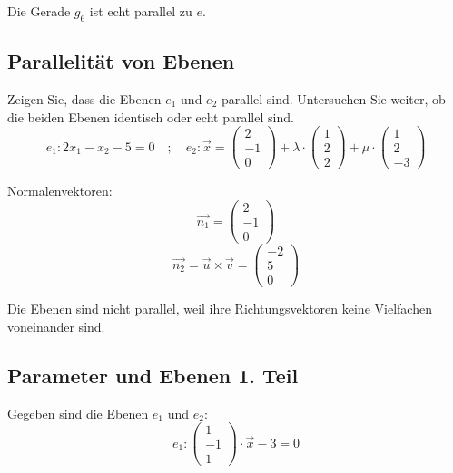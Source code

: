\documentclass{ajc}
\numberwithin{equation}{subsection}
\begin{document}
	Die Gerade $g_6$ ist echt parallel zu $e$.
	
	\subsection{Parallelität von Ebenen}
	Zeigen Sie, dass die Ebenen $e_1$ und $e_2$ parallel sind. Untersuchen Sie weiter, ob die beiden Ebenen identisch oder echt parallel sind.
	\begin{equation}
		e_1: 2x_1 - x_2 - 5 = 0 \quad ; \quad e_2: \vec{x} = \left(\begin{array}{r} 2 \\ -1 \\ 0\end{array}\right) + \lambda \cdot \left(\begin{array}{r} 1 \\ 2 \\ 2\end{array}\right) + \mu \cdot \left(\begin{array}{r} 1 \\ 2 \\ -3\end{array}\right)
	\end{equation}
	
	Normalenvektoren:
	\begin{equation}
		\vec{n_1} = \left(\begin{array}{r} 2 \\ -1 \\ 0\end{array}\right)
	\end{equation}
	\begin{equation}
		\vec{n_2} = \vec{u} \times \vec{v} = \left(\begin{array}{r} -2 \\ 5 \\ 0\end{array}\right)
	\end{equation}
	
	Die Ebenen sind nicht parallel, weil ihre Richtungsvektoren keine Vielfachen voneinander sind.
	
	\subsection{Parameter und Ebenen 1. Teil}
	Gegeben sind die Ebenen $e_1$ und $e_2$:
	\begin{equation}
		e_1: \left(\begin{array}{r} 1 \\ -1 \\ 1\end{array}\right) \cdot \vec{x} - 3 = 0 
	\end{equation}
	
\end{document}
